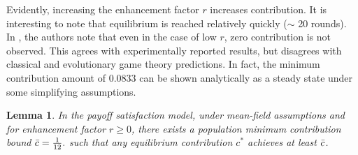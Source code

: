 Evidently, increasing the enhancement factor $r$ increases contribution. It is interesting to note that equilibrium is reached relatively quickly ($\sim$ 20 rounds). In \cite{RN49}, the authors note that even in the case of low $r$, zero contribution is not observed. This agrees with experimentally reported results, but disagrees with classical and evolutionary game theory predictions. In fact, the minimum contribution amount of 0.0833 can be shown analytically as a steady state under some simplifying assumptions.


\newtheorem{lemma_mcb}[theorem]{Lemma} 
\begin{lemma_mcb}\label{mcb} 
In the \emph{payoff satisfaction} model, under mean-field assumptions and for enhancement factor $r \geq0$, there exists a population minimum contribution bound $\Bar{c} = \tfrac{1}{12}.$ such that any equilibrium contribution $c^*$ achieves at least $\Bar{c}$.  \end{lemma_mcb}
